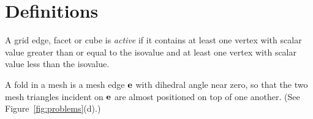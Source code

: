 
\section{Definitions}
\label{section:definitions}

A grid edge, facet or cube is {\em active} if it contains at least one vertex 
with scalar value greater than or equal to the isovalue
and at least one vertex with scalar value less than the isovalue.

A fold in a mesh is a mesh edge $\mathbf{e}$ with dihedral angle near zero,
so that the two mesh triangles incident on $\mathbf{e}$ are almost positioned
on top of one another. (See Figure~\ref{fig:problems}(d).)
